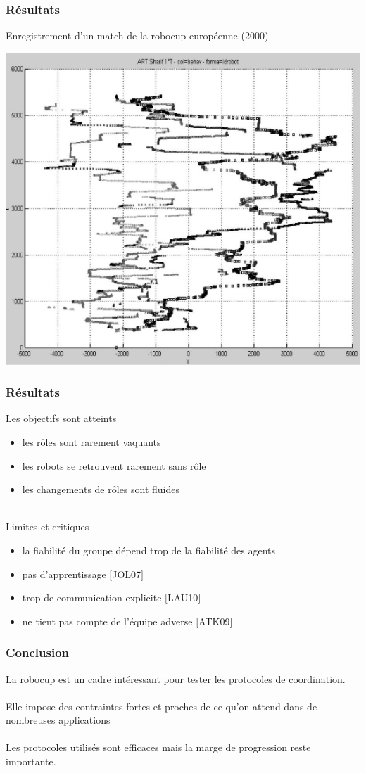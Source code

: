 \documentclass{beamer}
\begin{document}
\begin{frame}
\frametitle{Résultats}
Enregistrement d'un match de la robocup européenne (2000)
\begin{center}
    \includegraphics[width=.70\linewidth]{images/log}
\end{center}
\end{frame}


\begin{frame}
\frametitle{Résultats}
Les objectifs sont atteints
\begin{itemize}
    \item les rôles sont rarement vaquants
    \item les robots se retrouvent rarement sans rôle
    \item les changements de rôles sont fluides
\end{itemize}
~\\
Limites et critiques
\begin{itemize}
    \item la fiabilité du groupe dépend trop de la fiabilité des agents
    \item pas d'apprentissage $[$JOL07$]$
    \item trop de communication explicite $[$LAU10$]$
    \item ne tient pas compte de l'équipe adverse $[$ATK09$]$
\end{itemize}
\end{frame}


\begin{frame}
\frametitle{Conclusion}
La robocup est un cadre intéressant pour tester les protocoles de coordination.\\
~\\
Elle impose des contraintes fortes et proches de ce qu'on attend dans de nombreuses applications\\
~\\
Les protocoles utilisés sont efficaces mais la marge de progression reste importante.
\end{frame}
\end{document}
